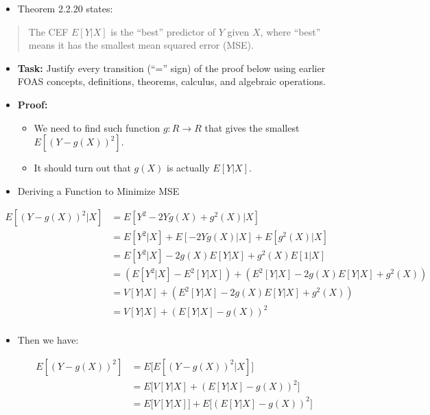 \documentclass[
]{book}
\providecommand{\tightlist}{%
  \setlength{\itemsep}{0pt}\setlength{\parskip}{0pt}}
\theoremstyle{definition}
\theoremstyle{definition}
\theoremstyle{definition}
\theoremstyle{definition}
\theoremstyle{remark}
\begin{document}
\begin{itemize}
\tightlist
\item
  Theorem 2.2.20 states:
\end{itemize}

\begin{quote}
The CEF \(E[Y|X]\) is the ``best'' predictor of \(Y\) given \(X\), where ``best'' means it has the smallest mean squared error (MSE).
\end{quote}

\begin{itemize}
\item
  \textbf{Task:} Justify every transition (``='' sign) of the proof below using earlier FOAS concepts, definitions, theorems, calculus, and algebraic operations.
\item
  \textbf{Proof:}

  \begin{itemize}
  \tightlist
  \item
    We need to find such function \(g: R \to R\) that gives the smallest \(E[(Y-g(X))^2]\).
  \item
    It should turn out that \(g(X)\) is actually \(E[Y|X]\).
  \end{itemize}
\item
  Deriving a Function to Minimize MSE
\end{itemize}

\[ 
\begin{aligned}
  E[(Y - g(X))^2|X]
      &= E[Y^2 - 2Yg(X) + g^2(X)|X]                                \\
      &= E[Y^2|X] + E[-2Yg(X)|X] + E[g^2(X)|X]                     \\
      &= E[Y^2|X] - 2g(X)E[Y|X] + g^2(X)E[1|X]                     \\
      &= (E[Y^2|X] - E^2[Y|X]) + (E^2[Y|X] - 2g(X)E[Y|X] + g^2(X)) \\
      &= V[Y|X] + (E^2[Y|X] - 2g(X)E[Y|X] + g^2(X))                \\
      &= V[Y|X] + (E[Y|X] - g(X))^2                                \\
\end{aligned} 
\]

\begin{itemize}
\tightlist
\item
  Then we have:
\end{itemize}

\[
\begin{aligned}
  E[(Y-g(X))^2] &= E\big[E[(Y-g(X))^2|X]\big]     \\ 
    &=E\big[V[Y|X]+(E[Y|X]-g(X))^2\big]           \\
    &=E\big[V[Y|X]\big]+E\big[(E[Y|X]-g(X))^2\big]\\
\end{aligned}
\]
\end{document}

